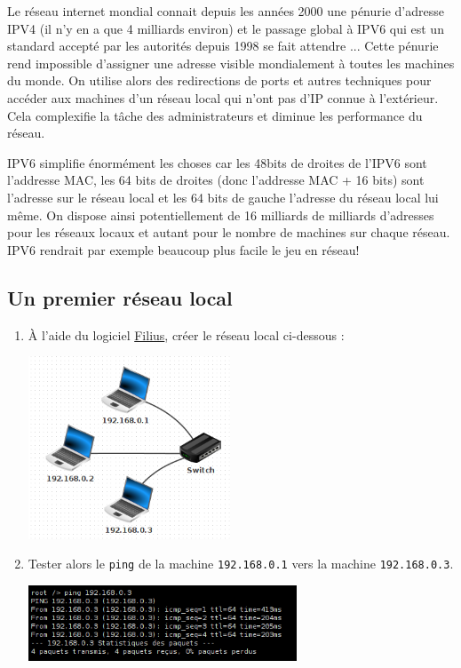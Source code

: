 \documentclass[a4paper,dvipsnames]{article}
\begin{document}
  Le réseau internet mondial connait depuis les années 2000 une pénurie
  d'adresse IPV4 (il n'y en a que 4 milliards environ) et le passage global à
  IPV6 qui est un standard accepté par les autorités depuis 1998 se fait
  attendre ...  Cette pénurie rend impossible d'assigner une adresse visible
  mondialement à toutes les machines du monde. On utilise alors des redirections
  de ports et autres techniques pour accéder aux machines d'un réseau local qui
  n'ont pas d'IP connue à l'extérieur. Cela complexifie la tâche des
  administrateurs et diminue les performance du réseau.

  IPV6 simplifie énormément les choses car les 48bits de droites de l'IPV6 sont
  l'addresse MAC, les 64 bits de droites (donc l'addresse MAC + 16 bits) sont
  l'adresse sur le réseau local et les 64 bits de gauche l'adresse du réseau
  local lui même. On dispose ainsi potentiellement de 16 milliards de milliards
  d'adresses pour les réseaux locaux et autant pour le nombre de machines sur
  chaque réseau. IPV6 rendrait par exemple beaucoup plus facile le jeu en réseau!

\medskip

\subsection{Un premier réseau local}

\begin{activite}[breakable]{}{}
  \begin{enumerate}
    \item À l'aide du logiciel \href{https://www.lernsoftware-filius.de/Herunterladen}{Filius}, créer le réseau local ci-dessous :

      \begin{center}
	\includegraphics[width=6cm]{img/f1.png}
      \end{center}

    \item Tester alors le \texttt{ping} de la machine \texttt{192.168.0.1} vers la machine \texttt{192.168.0.3}.

      \begin{center}
	\includegraphics[width=8cm]{img/ft1.png}
      \end{center}
  \end{enumerate}
\end{activite}
\end{document}
